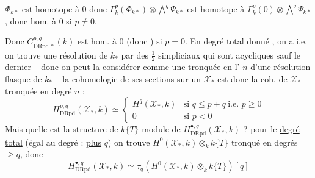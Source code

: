 $\Phi_{k*}$ est   homotope à 0 donc $\Gamma^p_k(\Phi_{k*})\otimes\bigwedge^q\Psi_{k*}$  est homotope à $\Gamma^p_k(0)\otimes\bigwedge^q\Psi_{k*}$, donc hom. à 0 si $p\ne0$.

Donc $C^{p,q}_{\mathrm{DRpd}\,*}(k)$ est hom. à 0 (donc  ) si $p=0$. En degré total donné , on a
i.e. on trouve une résolution   de $k_*$ par des   $\frac12$ simpliciaux qui sont acycliques sauf le dernier -- donc on peut la considérer comme une tronquée en l'  $n$ d'une résolution flasque de $k_*$ -- la cohomologie de ses sections sur un $\mathcal X_*$ est donc la coh. de $\mathcal X_*$ tronquée en degré $n$ :
\[
H^{p,q}_{\mathrm{DRpd}}(\mathcal X_*,k)\simeq
\begin{cases}
H^q(\mathcal X_*,k)&\text{si }q\leq p+q\ \text{i.e. }p\geq0\\
0&\text{si }p<0
\end{cases}
\]
Mais quelle est  la structure de $k\{T\}$-module de $H^{\bullet,q}_{\mathrm{DRpd}}(\mathcal X_*,k)$ ?  pour le \uline{degré total} (égal au degré  : \uline{plus} $q$) on trouve $H^0(\mathcal X_*,k)\otimes_k k\{T\}$ tronqué en degrés $\geq q$, donc
\[
H^{\bullet,q}_{\mathrm{DRpd}}(\mathcal X_*,k)\simeq\tau_q\left(H^0(\mathcal X_*,k)\otimes_k k\{T\}\right)[q]
\]

